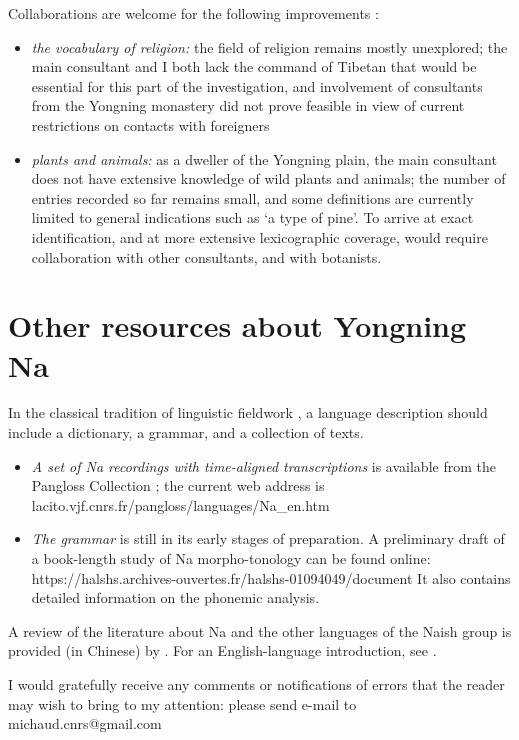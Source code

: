 Collaborations are welcome for the following improvements :
\begin{itemize}
	\item \textit{the vocabulary of religion:} the field of religion remains mostly unexplored; the main consultant and I both lack the command of Tibetan that would be essential for this part of the investigation, and involvement of consultants from the Yongning monastery did not prove feasible in view of current restrictions on contacts with foreigners
	\item \textit{plants and animals:} as a dweller of the Yongning plain, the main consultant does not have extensive knowledge of wild plants and animals; the number of entries recorded so far remains small, and some definitions are currently limited to general indications such as ‘a type of pine'. To arrive at exact identification, and at more extensive lexicographic coverage, would require collaboration with other consultants, and with botanists.
\end{itemize}

	\section{Other resources about Yongning Na} \label{sec:resources}
	
	In the classical tradition of linguistic fieldwork \citep{Dixon2007}, a language description should include a dictionary, a grammar, and a collection of texts. 
	
	\begin{itemize}
		\item \textit{A set of Na recordings with time-aligned transcriptions} is available from the Pangloss Collection \citep{Michailovsky2014}; the current web address is lacito.vjf.cnrs.fr/pangloss/languages/Na\_en.htm 
		\item \textit{The grammar} is still in its early stages of preparation. A preliminary draft of a book-length study of Na morpho-tonology can be found online: https://halshs.archives-ouvertes.fr/halshs-01094049/document It also contains detailed information on the phonemic analysis.
	\end{itemize}
	
A review of the literature about Na and the other languages of the Naish  group is provided (in Chinese) by \citet{Li2015}. For an English-language introduction, see \citet{Michaud2015b}.

I would gratefully receive any comments or notifications of errors that the reader may wish to bring to my attention: please send e-mail to michaud.cnrs@gmail.com 


